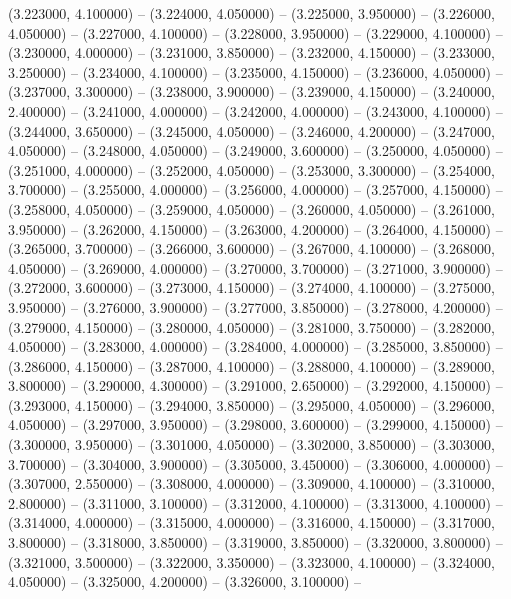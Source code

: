 (3.223000, 4.100000) -- 
(3.224000, 4.050000) -- 
(3.225000, 3.950000) -- 
(3.226000, 4.050000) -- 
(3.227000, 4.100000) -- 
(3.228000, 3.950000) -- 
(3.229000, 4.100000) -- 
(3.230000, 4.000000) -- 
(3.231000, 3.850000) -- 
(3.232000, 4.150000) -- 
(3.233000, 3.250000) -- 
(3.234000, 4.100000) -- 
(3.235000, 4.150000) -- 
(3.236000, 4.050000) -- 
(3.237000, 3.300000) -- 
(3.238000, 3.900000) -- 
(3.239000, 4.150000) -- 
(3.240000, 2.400000) -- 
(3.241000, 4.000000) -- 
(3.242000, 4.000000) -- 
(3.243000, 4.100000) -- 
(3.244000, 3.650000) -- 
(3.245000, 4.050000) -- 
(3.246000, 4.200000) -- 
(3.247000, 4.050000) -- 
(3.248000, 4.050000) -- 
(3.249000, 3.600000) -- 
(3.250000, 4.050000) -- 
(3.251000, 4.000000) -- 
(3.252000, 4.050000) -- 
(3.253000, 3.300000) -- 
(3.254000, 3.700000) -- 
(3.255000, 4.000000) -- 
(3.256000, 4.000000) -- 
(3.257000, 4.150000) -- 
(3.258000, 4.050000) -- 
(3.259000, 4.050000) -- 
(3.260000, 4.050000) -- 
(3.261000, 3.950000) -- 
(3.262000, 4.150000) -- 
(3.263000, 4.200000) -- 
(3.264000, 4.150000) -- 
(3.265000, 3.700000) -- 
(3.266000, 3.600000) -- 
(3.267000, 4.100000) -- 
(3.268000, 4.050000) -- 
(3.269000, 4.000000) -- 
(3.270000, 3.700000) -- 
(3.271000, 3.900000) -- 
(3.272000, 3.600000) -- 
(3.273000, 4.150000) -- 
(3.274000, 4.100000) -- 
(3.275000, 3.950000) -- 
(3.276000, 3.900000) -- 
(3.277000, 3.850000) -- 
(3.278000, 4.200000) -- 
(3.279000, 4.150000) -- 
(3.280000, 4.050000) -- 
(3.281000, 3.750000) -- 
(3.282000, 4.050000) -- 
(3.283000, 4.000000) -- 
(3.284000, 4.000000) -- 
(3.285000, 3.850000) -- 
(3.286000, 4.150000) -- 
(3.287000, 4.100000) -- 
(3.288000, 4.100000) -- 
(3.289000, 3.800000) -- 
(3.290000, 4.300000) -- 
(3.291000, 2.650000) -- 
(3.292000, 4.150000) -- 
(3.293000, 4.150000) -- 
(3.294000, 3.850000) -- 
(3.295000, 4.050000) -- 
(3.296000, 4.050000) -- 
(3.297000, 3.950000) -- 
(3.298000, 3.600000) -- 
(3.299000, 4.150000) -- 
(3.300000, 3.950000) -- 
(3.301000, 4.050000) -- 
(3.302000, 3.850000) -- 
(3.303000, 3.700000) -- 
(3.304000, 3.900000) -- 
(3.305000, 3.450000) -- 
(3.306000, 4.000000) -- 
(3.307000, 2.550000) -- 
(3.308000, 4.000000) -- 
(3.309000, 4.100000) -- 
(3.310000, 2.800000) -- 
(3.311000, 3.100000) -- 
(3.312000, 4.100000) -- 
(3.313000, 4.100000) -- 
(3.314000, 4.000000) -- 
(3.315000, 4.000000) -- 
(3.316000, 4.150000) -- 
(3.317000, 3.800000) -- 
(3.318000, 3.850000) -- 
(3.319000, 3.850000) -- 
(3.320000, 3.800000) -- 
(3.321000, 3.500000) -- 
(3.322000, 3.350000) -- 
(3.323000, 4.100000) -- 
(3.324000, 4.050000) -- 
(3.325000, 4.200000) -- 
(3.326000, 3.100000) -- 
